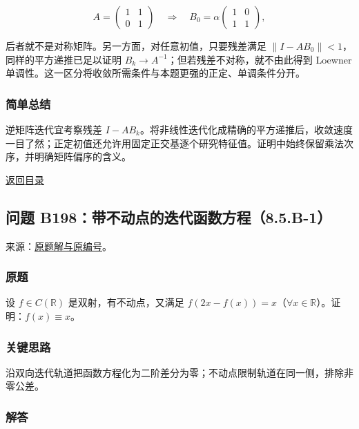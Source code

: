 \documentclass[11pt,a4paper]{article}
\begin{document}
\[
A=\begin{pmatrix}1&1\\0&1\end{pmatrix}
\quad\Longrightarrow\quad
B_0=\alpha\begin{pmatrix}1&0\\1&1\end{pmatrix},
\]

后者就不是对称矩阵。另一方面，对任意初值，只要残差满足
\(\|I-AB_0\|<1\)，同样的平方递推已足以证明
\(B_k\to A^{-1}\)；但若残差不对称，就不由此得到 Loewner
单调性。这一区分将收敛所需条件与本题更强的正定、单调条件分开。

\subsubsection{简单总结}\label{ux7b80ux5355ux603bux7ed3-16}

逆矩阵迭代宜考察残差
\(I-AB_k\)。将非线性迭代化成精确的平方递推后，收敛速度一目了然；正定初值还允许用固定正交基逐个研究特征值。证明中始终保留乘法次序，并明确矩阵偏序的含义。

\noindent\hyperref[contents]{返回目录}

\subsection{问题
B198：带不动点的迭代函数方程（8.5.B-1）}\label{ux95eeux9898-b198ux5e26ux4e0dux52a8ux70b9ux7684ux8fedux4ee3ux51fdux6570ux65b9ux7a0b8.5.b-1}

来源：\href{https://zj139.github.io/math-notes/problems/7eefe730d0abc9edb8bf7c08/\#问题-b198}{原题解与原编号}。

\subsubsection{原题}\label{ux539fux9898-17}

设 \(f\in C(\mathbb R)\) 是双射，有不动点，又满足
\(f(2x-f(x))=x\)（\(\forall x\in\mathbb R\)）。证明：\(f(x)\equiv x\)。

\subsubsection{关键思路}\label{ux5173ux952eux601dux8def-17}

沿双向迭代轨道把函数方程化为二阶差分为零；不动点限制轨道在同一侧，排除非零公差。

\subsubsection{解答}\label{ux89e3ux7b54-17}
\end{document}
